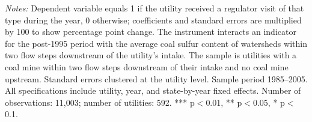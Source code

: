 \begin{table}[htbp]
\begin{minipage}{\linewidth}
\textit{Notes:} Dependent variable equals 1 if the utility received a regulator visit of that type during the year, 0 otherwise; coefficients and standard errors are multiplied by 100 to show percentage point change. The instrument interacts an indicator for the post-1995 period with the average coal sulfur content of watersheds within two flow steps downstream of the utility's intake. The sample is utilities with a coal mine within two flow steps downstream of their intake and no coal mine upstream. Standard errors clustered at the utility level. Sample period 1985--2005. All specifications include utility, year, and state-by-year fixed effects. Number of observations: 11,003; number of utilities: 592. *** p$<$0.01, ** p$<$0.05, * p$<$0.1.
\end{minipage}
\end{table}
